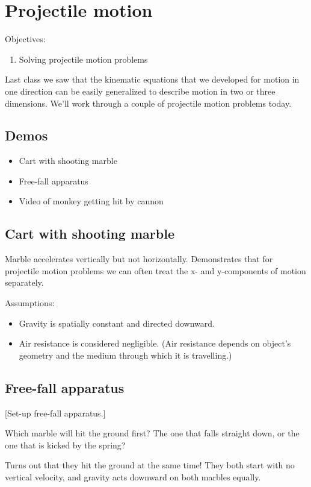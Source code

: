 \section{Projectile motion}
Objectives:
\begin{enumerate}
\item Solving projectile motion problems
\end{enumerate}

Last class we saw that the kinematic equations that we developed for motion in one direction can be easily generalized to describe motion in two or three dimensions. We'll work through a couple of projectile motion problems today.

\hrulefill
\subsection{Demos}
\begin{itemize}
\item Cart with shooting marble
\item Free-fall apparatus
\item Video of monkey getting hit by cannon
\end{itemize}

\subsection*{Cart with shooting marble}
Marble accelerates vertically but not horizontally. Demonstrates that for projectile motion problems we can often treat the x- and y-components of motion separately.

Assumptions:
\begin{itemize}
  \item Gravity is spatially constant and directed downward.
  \item Air resistance is considered negligible. (Air resistance depends on object's geometry and the medium through which it is travelling.)
\end{itemize}


\subsection*{Free-fall apparatus}

[Set-up free-fall apparatus.]

Which marble will hit the ground first? The one that falls straight down, or the one that is kicked by the spring?

Turns out that they hit the ground at the same time! They both start with no vertical velocity, and gravity acts downward on both marbles equally.

